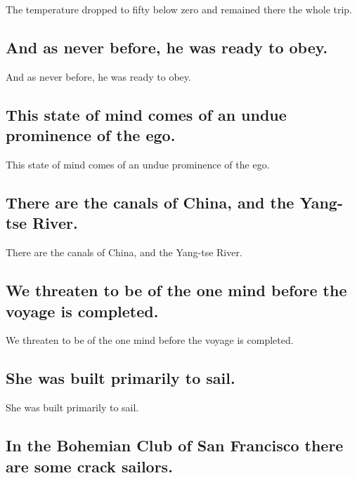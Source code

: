 \documentclass[]{article}
\begin{document}
The temperature dropped to fifty below zero and remained there the whole
trip.

\hypertarget{and-as-never-before-he-was-ready-to-obey.}{%
\subsection{And as never before, he was ready to
obey.}\label{and-as-never-before-he-was-ready-to-obey.}}

And as never before, he was ready to obey.

\hypertarget{this-state-of-mind-comes-of-an-undue-prominence-of-the-ego.}{%
\subsection{This state of mind comes of an undue prominence of the
ego.}\label{this-state-of-mind-comes-of-an-undue-prominence-of-the-ego.}}

This state of mind comes of an undue prominence of the ego.

\hypertarget{there-are-the-canals-of-china-and-the-yang-tse-river.}{%
\subsection{There are the canals of China, and the Yang-tse
River.}\label{there-are-the-canals-of-china-and-the-yang-tse-river.}}

There are the canals of China, and the Yang-tse River.

\hypertarget{we-threaten-to-be-of-the-one-mind-before-the-voyage-is-completed.}{%
\subsection{We threaten to be of the one mind before the voyage is
completed.}\label{we-threaten-to-be-of-the-one-mind-before-the-voyage-is-completed.}}

We threaten to be of the one mind before the voyage is completed.

\hypertarget{she-was-built-primarily-to-sail.}{%
\subsection{She was built primarily to
sail.}\label{she-was-built-primarily-to-sail.}}

She was built primarily to sail.

\hypertarget{in-the-bohemian-club-of-san-francisco-there-are-some-crack-sailors.}{%
\subsection{In the Bohemian Club of San Francisco there are some crack
sailors.}\label{in-the-bohemian-club-of-san-francisco-there-are-some-crack-sailors.}}
\end{document}
